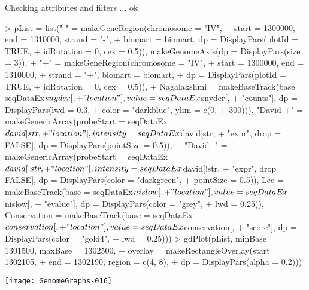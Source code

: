 \documentclass[11pt]{article}
\begin{document}
\begin{Schunk}
\begin{Soutput}
Checking attributes and filters ... ok
\end{Soutput}
\begin{Sinput}
> pList = list("-" = makeGeneRegion(chromosome = "IV", 
+     start = 1300000, end = 1310000, strand = "-", 
+     biomart = biomart, dp = DisplayPars(plotId = TRUE, 
+         idRotation = 0, cex = 0.5)), makeGenomeAxis(dp = DisplayPars(size = 3)), 
+     "+" = makeGeneRegion(chromosome = "IV", 
+         start = 1300000, end = 1310000, 
+         strand = "+", biomart = biomart, 
+         dp = DisplayPars(plotId = TRUE, 
+             idRotation = 0, cex = 0.5)), 
+     Nagalakshmi = makeBaseTrack(base = seqDataEx$snyder[, 
+         "location"], value = seqDataEx$snyder[, 
+         "counts"], dp = DisplayPars(lwd = 0.3, 
+         color = "darkblue", ylim = c(0, 
+             300))), "David +" = makeGenericArray(probeStart = seqDataEx$david[str, 
+         "location"], intensity = seqDataEx$david[str, 
+         "expr", drop = FALSE], dp = DisplayPars(pointSize = 0.5)), 
+     "David -" = makeGenericArray(probeStart = seqDataEx$david[!str, 
+         "location"], intensity = seqDataEx$david[!str, 
+         "expr", drop = FALSE], dp = DisplayPars(color = "darkgreen", 
+         pointSize = 0.5)), Lee = makeBaseTrack(base = seqDataEx$nislow[, 
+         "location"], value = seqDataEx$nislow[, 
+         "evalue"], dp = DisplayPars(color = "grey", 
+         lwd = 0.25)), Conservation = makeBaseTrack(base = seqDataEx$conservation[, 
+         "location"], value = seqDataEx$conservation[, 
+         "score"], dp = DisplayPars(color = "gold4", 
+         lwd = 0.25)))
> gdPlot(pList, minBase = 1301500, maxBase = 1302500, 
+     overlay = makeRectangleOverlay(start = 1302105, 
+         end = 1302190, region = c(4, 8), 
+         dp = DisplayPars(alpha = 0.2)))
\end{Sinput}
\end{Schunk}
\texttt{[image: GenomeGraphs-016]}
\end{document}
